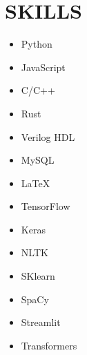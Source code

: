 \documentclass[11pt,letter,sans]{moderncv} %
\begin{document}
\section{SKILLS}
    \begin{cvcolumns}
        {
            \vspace{-0.5em}
                \begin{itemize}
                    \item Python
                    \item JavaScript
                    \item C/C++
                    \item Rust
                    \item Verilog HDL
                    \item MySQL
                    \item \LaTeX
                \end{itemize}
        }
        {
            \vspace{-.5em}
                \begin{itemize}
                        \item TensorFlow
                        \item Keras
                        \item NLTK
                        \item SKlearn
                        \item SpaCy
                        \item Streamlit
                        \item Transformers
                \end{itemize}
        }
        

\end{cvcolumns}
\end{document}
